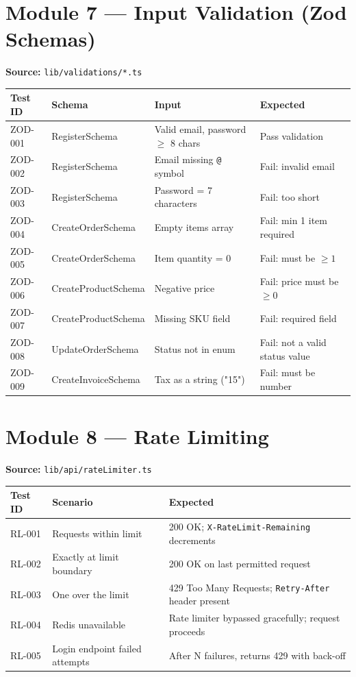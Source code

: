 \documentclass[12pt,a4paper]{report}
\begin{document}
\section{Module 7 --- Input Validation (Zod Schemas)}

\textbf{Source:} \texttt{lib/validations/*.ts}

\begin{longtable}{p{}p{}p{}p{}}
    \toprule
    \textbf{Test ID} & \textbf{Schema} & \textbf{Input} & \textbf{Expected} \\
    \midrule
    \endhead
    ZOD-001 & RegisterSchema & Valid email, password $\geq$ 8 chars & Pass validation \\
    ZOD-002 & RegisterSchema & Email missing \texttt{@} symbol & Fail: invalid email \\
    ZOD-003 & RegisterSchema & Password = 7 characters & Fail: too short \\
    ZOD-004 & CreateOrderSchema & Empty items array & Fail: min 1 item required \\
    ZOD-005 & CreateOrderSchema & Item quantity = 0 & Fail: must be $\geq 1$ \\
    ZOD-006 & CreateProductSchema & Negative price & Fail: price must be $\geq 0$ \\
    ZOD-007 & CreateProductSchema & Missing SKU field & Fail: required field \\
    ZOD-008 & UpdateOrderSchema & Status not in enum & Fail: not a valid status value \\
    ZOD-009 & CreateInvoiceSchema & Tax as a string ("15") & Fail: must be number \\
    \bottomrule
\end{longtable}

\section{Module 8 --- Rate Limiting}

\textbf{Source:} \texttt{lib/api/rateLimiter.ts}

\begin{longtable}{p{}p{}p{}}
    \toprule
    \textbf{Test ID} & \textbf{Scenario} & \textbf{Expected} \\
    \midrule
    \endhead
    RL-001 & Requests within limit & 200 OK; \texttt{X-RateLimit-Remaining} decrements \\
    RL-002 & Exactly at limit boundary & 200 OK on last permitted request \\
    RL-003 & One over the limit & 429 Too Many Requests; \texttt{Retry-After} header present \\
    RL-004 & Redis unavailable & Rate limiter bypassed gracefully; request proceeds \\
    RL-005 & Login endpoint failed attempts & After N failures, returns 429 with back-off \\
    \bottomrule
\end{longtable}
\end{document}
